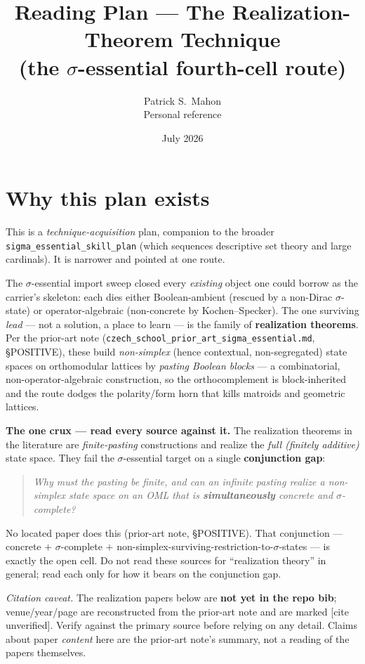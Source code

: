 \documentclass[11pt]{article}
\title{Reading Plan --- The Realization-Theorem Technique\\
\large (the $\sigma$-essential fourth-cell route)}
\author{Patrick S.\ Mahon \\ \small Personal reference}
\date{July 2026}
\begin{document}
\maketitle

\section*{Why this plan exists}

\noindent This is a \emph{technique-acquisition} plan, companion to the broader
\texttt{sigma\_essential\_skill\_plan} (which sequences descriptive set theory and
large cardinals). It is narrower and pointed at one route.

The $\sigma$-essential import sweep closed every \emph{existing} object one could
borrow as the carrier's skeleton: each dies either Boolean-ambient (rescued by a
non-Dirac $\sigma$-state) or operator-algebraic (non-concrete by Kochen--Specker).
The one surviving \emph{lead} --- not a solution, a place to learn --- is the family
of \textbf{realization theorems}. Per the prior-art note
(\texttt{czech\_school\_prior\_art\_sigma\_essential.md}, \S POSITIVE), these build
\emph{non-simplex} (hence contextual, non-segregated) state spaces on orthomodular
lattices by \emph{pasting Boolean blocks} --- a combinatorial, non-operator-algebraic
construction, so the orthocomplement is block-inherited and the route dodges the
polarity/form horn that kills matroids and geometric lattices.

\medskip
\noindent\textbf{The one crux --- read every source against it.} The realization
theorems in the literature are \emph{finite-pasting} constructions and realize the
\emph{full (finitely additive)} state space. They fail the $\sigma$-essential target
on a single \textbf{conjunction gap}:
\begin{quote}
\emph{Why must the pasting be finite, and can an infinite pasting realize a
non-simplex state space on an OML that is \textbf{simultaneously} concrete and
$\sigma$-complete?}
\end{quote}
No located paper does this (prior-art note, \S POSITIVE). That conjunction --- concrete
$+$ $\sigma$-complete $+$ non-simplex-surviving-restriction-to-$\sigma$-states --- is
exactly the open cell. Do not read these sources for ``realization theory'' in
general; read each only for how it bears on the conjunction gap.

\medskip
\noindent\emph{Citation caveat.} The realization papers below are \textbf{not yet in
the repo bib}; venue/year/page are reconstructed from the prior-art note and are marked
\textup{[cite unverified]}. Verify against the primary source before relying on any
detail. Claims about paper \emph{content} here are the prior-art note's summary, not a
reading of the papers themselves.
\end{document}
